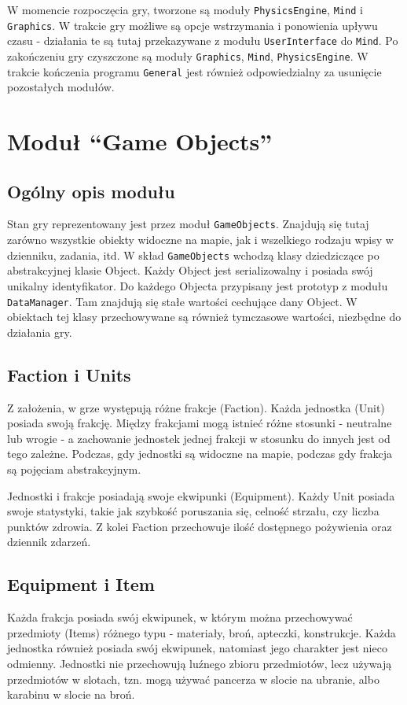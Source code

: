 \documentclass[licencjacka]{pracamgr}
\begin{document}
      W momencie rozpoczęcia gry, tworzone są moduły \texttt{PhysicsEngine}, \texttt{Mind} i \texttt{Graphics}. W trakcie gry możliwe są
      opcje wstrzymania i ponowienia upływu czasu - działania te są tutaj przekazywane z modułu \texttt{UserInterface} do
      \texttt{Mind}. Po zakończeniu gry czyszczone są moduły \texttt{Graphics}, \texttt{Mind}, \texttt{PhysicsEngine}. W trakcie kończenia programu
      \texttt{General} jest również odpowiedzialny za usunięcie pozostałych modułów.

  \section{Moduł ``Game Objects''}
    \subsection{Ogólny opis modułu}
      Stan gry reprezentowany jest przez moduł \texttt{GameObjects}. Znajdują się tutaj zarówno wszystkie obiekty widoczne na
      mapie, jak i wszelkiego rodzaju wpisy w dzienniku, zadania, itd. W skład \texttt{GameObjects} wchodzą klasy
      dziedziczące po abstrakcyjnej klasie Object. Każdy Object jest serializowalny i posiada swój unikalny
      identyfikator. Do każdego Objecta przypisany jest prototyp z modułu \texttt{DataManager}. Tam znajdują się stałe
      wartości cechujące dany Object. W obiektach tej klasy przechowywane są również tymczasowe wartości, niezbędne
      do działania gry.

    \subsection{Faction i Units}
      Z założenia, w grze występują różne frakcje (Faction). Każda jednostka (Unit) posiada swoją frakcję. Między
      frakcjami mogą istnieć różne stosunki - neutralne lub wrogie - a zachowanie jednostek jednej frakcji w stosunku
      do innych jest od tego zależne. Podczas, gdy jednostki są widoczne na mapie, podczas gdy frakcja są
      pojęciam abstrakcyjnym.

      Jednostki i frakcje posiadają swoje ekwipunki (Equipment). Każdy Unit posiada swoje statystyki, takie jak
      szybkość poruszania się, celność strzału, czy liczba punktów zdrowia. Z kolei Faction przechowuje ilość
      dostępnego pożywienia oraz dziennik zdarzeń.

    \subsection{Equipment i Item}
      Każda frakcja posiada swój ekwipunek, w którym można przechowywać przedmioty (Items) różnego typu - materiały,
      broń, apteczki, konstrukcje. Każda jednostka również posiada swój ekwipunek, natomiast jego charakter jest nieco
      odmienny. Jednostki nie przechowują luźnego zbioru przedmiotów, lecz używają przedmiotów w slotach, tzn. mogą
      używać pancerza w slocie na ubranie, albo karabinu w slocie na broń.
\end{document}
